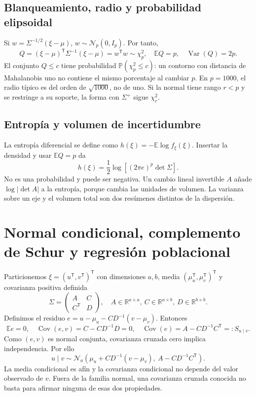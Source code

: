 \documentclass[11pt,a4paper]{article}
\newcommand{\R}{\mathbb R}
\newcommand{\E}{\mathbb E}
\newcommand{\Prob}{\mathbb P}
\newcommand{\T}{^{\mathsf T}}
\DeclareMathOperator{\Var}{Var}
\DeclareMathOperator{\Cov}{Cov}
\theoremstyle{definition}
\begin{document}
\subsection{Blanqueamiento, radio y probabilidad elipsoidal}
Si $w=\Sigma^{-1/2}(\xi-\mu)$, $w\sim\mathcal N_p(0,I_p)$. Por tanto,
\[
Q=(\xi-\mu)\T\Sigma^{-1}(\xi-\mu)=w\T w\sim\chi^2_p,
\quad\E Q=p,\quad\Var(Q)=2p.
\]
El conjunto $Q\le c$ tiene probabilidad $\Prob(\chi_p^2\le c)$: un contorno con distancia de Mahalanobis uno no contiene el mismo porcentaje al cambiar $p$. En $p=1000$, el radio típico es del orden de $\sqrt{1000}$, no de uno. Si la normal tiene rango $r<p$ y se restringe a su soporte, la forma con $\Sigma^+$ sigue $\chi^2_r$.
\subsection{Entropía y volumen de incertidumbre}
La entropía diferencial se define como $h(\xi)=-\E\log f_\xi(\xi)$. Insertar la densidad y usar $\E Q=p$ da
\[
h(\xi)=\frac12\log\!\left[(2\pi e)^p\det\Sigma\right].
\]
No es una probabilidad y puede ser negativa. Un cambio lineal invertible $A$ añade $\log|\det A|$ a la entropía, porque cambia las unidades de volumen. La varianza sobre un eje y el volumen total son dos resúmenes distintos de la dispersión.

\section{Normal condicional, complemento de Schur y regresión poblacional}
Particionemos $\xi=(u\T,v\T)\T$ con dimensiones $a,b$, media $(\mu_u\T,\mu_v\T)\T$ y covarianza positiva definida
\[
\Sigma=\begin{pmatrix}A&C\\C\T&D\end{pmatrix},\quad
A\in\R^{a\times a},\ C\in\R^{a\times b},\ D\in\R^{b\times b}.
\]
Definimos el residuo $e=u-\mu_u-CD^{-1}(v-\mu_v)$. Entonces
\[
\E e=0,\quad\Cov(e,v)=C-CD^{-1}D=0,
\quad\Cov(e)=A-CD^{-1}C\T=:S_{u\mid v}.
\]
Como $(e,v)$ es normal conjunta, covarianza cruzada cero implica independencia. Por ello
\[
\boxed{u\mid v\sim\mathcal N_a\!\left(\mu_u+CD^{-1}(v-\mu_v),\ A-CD^{-1}C\T\right)}.
\]
La media condicional es afín y la covarianza condicional no depende del valor observado de $v$. Fuera de la familia normal, una covarianza cruzada conocida no basta para afirmar ninguna de esas dos propiedades.
\end{document}
